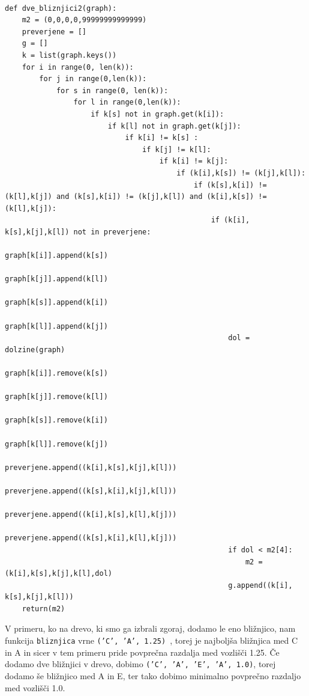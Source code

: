 \documentclass[a4paper,10pt]{article}
\begin{document}
\begin{verbatim}

def dve_bliznjici2(graph):
    m2 = (0,0,0,0,99999999999999)
    preverjene = []
    g = []
    k = list(graph.keys())
    for i in range(0, len(k)):
        for j in range(0,len(k)):
            for s in range(0, len(k)):
                for l in range(0,len(k)):
                    if k[s] not in graph.get(k[i]):
                        if k[l] not in graph.get(k[j]):
                            if k[i] != k[s] :
                                if k[j] != k[l]:
                                    if k[i] != k[j]:
                                        if (k[i],k[s]) != (k[j],k[l]):
                                            if (k[s],k[i]) != (k[l],k[j]) and (k[s],k[i]) != (k[j],k[l]) and (k[i],k[s]) != (k[l],k[j]):
                                                if (k[i], k[s],k[j],k[l]) not in preverjene:
                                                    graph[k[i]].append(k[s])
                                                    graph[k[j]].append(k[l])
                                                    graph[k[s]].append(k[i])
                                                    graph[k[l]].append(k[j])
                                                    dol = dolzine(graph)
                                                    graph[k[i]].remove(k[s])
                                                    graph[k[j]].remove(k[l])
                                                    graph[k[s]].remove(k[i])
                                                    graph[k[l]].remove(k[j])
                                                    preverjene.append((k[i],k[s],k[j],k[l]))
                                                    preverjene.append((k[s],k[i],k[j],k[l]))
                                                    preverjene.append((k[i],k[s],k[l],k[j]))
                                                    preverjene.append((k[s],k[i],k[l],k[j]))
                                                    if dol < m2[4]:
                                                        m2 = (k[i],k[s],k[j],k[l],dol)
                                                    g.append((k[i], k[s],k[j],k[l]))
    return(m2)
\end{verbatim}



V primeru, ko na drevo, ki smo ga izbrali zgoraj, dodamo le eno bližnjico, nam funkcija \texttt{bliznjica} vrne \texttt{('C', 'A', 1.25) }, torej je najboljša bližnjica med C in A in sicer v tem primeru pride povprečna razdalja med vozlišči 1.25. Če dodamo dve bližnjici v drevo, dobimo \texttt{('C', 'A', 'E', 'A', 1.0)}, torej dodamo še bližnjico med A in E, ter tako dobimo minimalno povprečno razdaljo med vozlišči 1.0.
\end{document}

